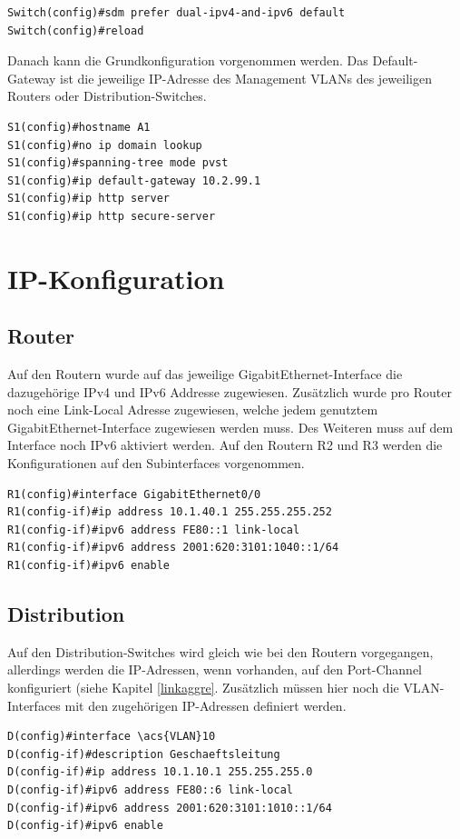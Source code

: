 \documentclass[11pt,a4paper]{scrreprt}
\begin{document}
\begin{lstlisting}[frame=single, captionpos=b,caption= Switch Template Wechsel]
Switch(config)#sdm prefer dual-ipv4-and-ipv6 default
Switch(config)#reload
\end{lstlisting}
\noindent
Danach kann die Grundkonfiguration vorgenommen werden. Das Default-Gateway ist die jeweilige IP-Adresse des Management \acs{VLAN}s des jeweiligen Routers oder Distribution-Switches.
\newline

\begin{lstlisting}[frame=single, captionpos=b,caption= Switch Grund Konfiguration]
S1(config)#hostname A1
S1(config)#no ip domain lookup
S1(config)#spanning-tree mode pvst
S1(config)#ip default-gateway 10.2.99.1
S1(config)#ip http server
S1(config)#ip http secure-server
\end{lstlisting}
\newpage
\section{IP-Konfiguration}
\subsection{Router}
Auf den Routern wurde auf das jeweilige GigabitEthernet-Interface die dazugehörige IPv4 und IPv6 Addresse zugewiesen. Zusätzlich wurde pro Router noch eine Link-Local Adresse zugewiesen, welche jedem genutztem GigabitEthernet-Interface zugewiesen werden muss. Des Weiteren muss auf dem Interface noch IPv6 aktiviert werden.
Auf den Routern R2 und R3 werden die Konfigurationen auf den Subinterfaces vorgenommen.
\newline
\begin{lstlisting}[frame=single, captionpos=b,caption= Router IP-Konfiguration]
R1(config)#interface GigabitEthernet0/0
R1(config-if)#ip address 10.1.40.1 255.255.255.252
R1(config-if)#ipv6 address FE80::1 link-local
R1(config-if)#ipv6 address 2001:620:3101:1040::1/64
R1(config-if)#ipv6 enable
\end{lstlisting}

\subsection{Distribution}
Auf den Distribution-Switches wird gleich wie bei den Routern vorgegangen, allerdings werden die IP-Adressen, wenn vorhanden, auf den Port-Channel konfiguriert (siehe Kapitel \ref{linkaggre}. Zusätzlich müssen hier noch die \acs{VLAN}-Interfaces mit den zugehörigen IP-Adressen definiert werden.
\newline
\begin{lstlisting}[frame=single, captionpos=b,caption= Distribution IP-Konfiguration]
D(config)#interface \acs{VLAN}10
D(config-if)#description Geschaeftsleitung
D(config-if)#ip address 10.1.10.1 255.255.255.0
D(config-if)#ipv6 address FE80::6 link-local
D(config-if)#ipv6 address 2001:620:3101:1010::1/64
D(config-if)#ipv6 enable
\end{lstlisting}
\end{document}
